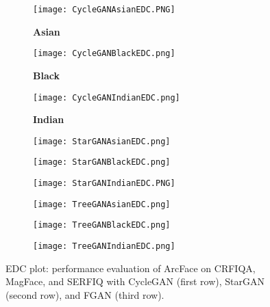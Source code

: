 {\begin{figure*}[htp]
		\centering
    \begin{subfigure}[b]{0.33\linewidth}
            \centering
            \caption*{\textbf{Asian}}
            \texttt{[image: CycleGANAsianEDC.PNG]}
    \end{subfigure}
    \begin{subfigure}[b]{0.31\linewidth}
        \centering
        \caption*{\textbf{Black}}
        \texttt{[image: CycleGANBlackEDC.png]}
    \end{subfigure}
    \begin{subfigure}[b]{0.32\linewidth}
        \centering
        \caption*{\textbf{Indian}}
        \texttt{[image: CycleGANIndianEDC.png]}
    \end{subfigure}
   \begin{subfigure}[b]{0.335\linewidth}
        \centering
        \texttt{[image: StarGANAsianEDC.png]}
        \label{fig:AsianCRFIQAL}
    \end{subfigure}
    \begin{subfigure}[b]{0.31\linewidth}
        \centering
        \texttt{[image: StarGANBlackEDC.png]}
    \end{subfigure}
    \begin{subfigure}[b]{0.32\linewidth}
        \centering
        \texttt{[image: StarGANIndianEDC.PNG]}
    \end{subfigure}
        \centering
        \begin{subfigure}[b]{0.335\linewidth}
        \centering
        \texttt{[image: TreeGANAsianEDC.png]}
    \end{subfigure}
    \begin{subfigure}[b]{0.31\linewidth}
        \centering
        \texttt{[image: TreeGANBlackEDC.png]}
    \end{subfigure}
    \begin{subfigure}[b]{0.32\linewidth}
        \centering
        \texttt{[image: TreeGANIndianEDC.png]}
    \end{subfigure}
    \caption{EDC plot: performance evaluation of ArcFace on CRFIQA, MagFace, and SERFIQ with CycleGAN (first row), StarGAN (second row), and FGAN (third row).}
    \vspace*{-0.3cm}
    \label{fig:edc}
\end{figure*}

}
